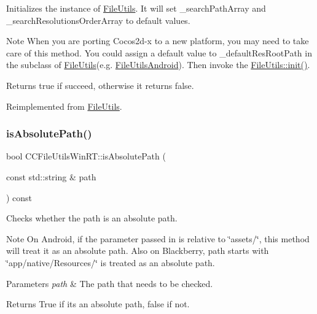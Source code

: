 Initializes the instance of \hyperlink{classFileUtils}{File\+Utils}. It will set \+\_\+search\+Path\+Array and \+\_\+search\+Resolutions\+Order\+Array to default values.

\begin{DoxyNote}{Note}
When you are porting Cocos2d-\/x to a new platform, you may need to take care of this method. You could assign a default value to \+\_\+default\+Res\+Root\+Path in the subclass of \hyperlink{classFileUtils}{File\+Utils}(e.\+g. \hyperlink{classFileUtilsAndroid}{File\+Utils\+Android}). Then invoke the \hyperlink{classFileUtils_a2c891e99dc7af7343f4f9e8d4798a563}{File\+Utils\+::init()}. 
\end{DoxyNote}
\begin{DoxyReturn}{Returns}
true if succeed, otherwise it returns false. 
\end{DoxyReturn}


Reimplemented from \hyperlink{classFileUtils_a2c891e99dc7af7343f4f9e8d4798a563}{File\+Utils}.

\mbox{\label{classCCFileUtilsWinRT_a25ecf188d3b1724cfa64e040d2a93f7b}} 
\subsubsection{\texorpdfstring{is\+Absolute\+Path()}{isAbsolutePath()}}
{\footnotesize\ttfamily bool C\+C\+File\+Utils\+Win\+R\+T\+::is\+Absolute\+Path (\begin{DoxyParamCaption}\item[{const std\+::string \&}]{path }\end{DoxyParamCaption}) const\hspace{0.3cm}{\ttfamily [virtual]}}

Checks whether the path is an absolute path.

\begin{DoxyNote}{Note}
On Android, if the parameter passed in is relative to \char`\"{}assets/\char`\"{}, this method will treat it as an absolute path. Also on Blackberry, path starts with \char`\"{}app/native/\+Resources/\char`\"{} is treated as an absolute path.
\end{DoxyNote}

\begin{DoxyParams}{Parameters}
{\em path} & The path that needs to be checked. \\
\hline
\end{DoxyParams}
\begin{DoxyReturn}{Returns}
True if it\textquotesingle{}s an absolute path, false if not. 
\end{DoxyReturn}


